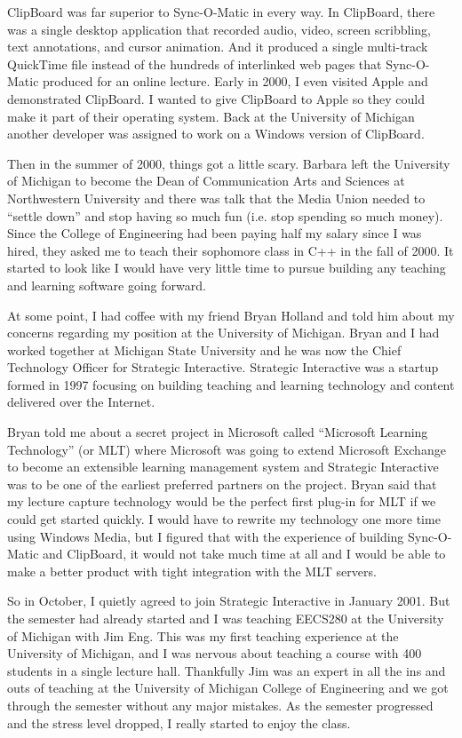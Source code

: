 \documentclass[12pt]{book}
\begin{document}
ClipBoard was far superior to Sync-O-Matic in every way.  In ClipBoard,
there was a single desktop application that recorded audio, video,
screen scribbling, text annotations, and cursor animation.
And it produced a single multi-track QuickTime file instead of
the hundreds of interlinked web pages that Sync-O-Matic produced
for an online lecture.  Early in 2000, I even visited Apple and
demonstrated ClipBoard.  I wanted to give ClipBoard to Apple so they could
make it part of their operating system.  Back at the University
of Michigan another developer was assigned to work on a Windows
version of ClipBoard.

Then in the summer of 2000, things got a little scary.
Barbara left the University of Michigan to become the
Dean of Communication Arts and Sciences at
Northwestern University and there was talk that the Media Union
needed to ``settle down'' and stop having so much fun (i.e. stop
spending so much money).  Since the College of Engineering had
been paying half my salary since I was hired, they asked me to
teach their sophomore class in C++ in the fall of 2000.  It started
to look like I would have very little time to pursue building
any teaching and learning software going forward.

At some point, I had coffee with my friend Bryan Holland
and told him about my concerns regarding my position at
the University of Michigan.
Bryan and I had worked together at Michigan State University and
he was now the Chief Technology Officer for Strategic Interactive.
Strategic Interactive was a startup formed in 1997 focusing on
building teaching and learning technology and content delivered over the
Internet.

Bryan told me about a secret project in Microsoft called ``Microsoft
Learning Technology'' (or MLT) where Microsoft was going to
extend Microsoft Exchange to become an extensible learning
management system and Strategic Interactive was to be one of
the earliest preferred partners on the project.  Bryan said
that my lecture capture technology would be the perfect
first plug-in for MLT if we could get started quickly.  I
would have to rewrite my technology one more time using
Windows Media, but I figured that with the experience of
building Sync-O-Matic and ClipBoard, it would not take much time
at all and I would be able to make a better product
with tight integration with the MLT servers.

So in October, I quietly agreed to join Strategic Interactive
in January 2001.  But the semester had already started and
I was teaching EECS280 at the University of Michigan with Jim Eng.
This was my first teaching experience at the University of Michigan, and
I was nervous about teaching a course with 400 students
in a single lecture hall.
Thankfully Jim was an expert in all the
ins and outs of teaching at the University of Michigan College of
Engineering and we got through the semester without any major
mistakes.   As the semester progressed and the stress level dropped,
I really started to enjoy the class.
\end{document}
